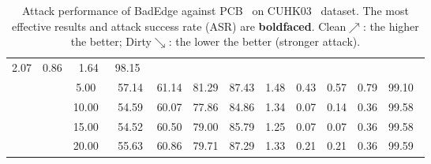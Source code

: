 \begin{table}[htbp]
{\begin{tabular}{cc|c|ccccccccc}
  \multicolumn{1}{c|}{2.07} &
  \multicolumn{1}{c|}{0.86} &
  \multicolumn{1}{c|}{1.64} &
  98.15\ \\ \cline{3-12} 
\multicolumn{1}{c|}{} &
   &
  5.00\ &
  \multicolumn{1}{c|}{57.14} &
  \multicolumn{1}{c|}{61.14} &
  \multicolumn{1}{c|}{81.29} &
  \multicolumn{1}{c|}{87.43} &
  \multicolumn{1}{c|}{1.48} &
  \multicolumn{1}{c|}{0.43} &
  \multicolumn{1}{c|}{0.57} &
  \multicolumn{1}{c|}{0.79} &
  99.10\ \\ \cline{3-12} 
\multicolumn{1}{c|}{} &
   &
  10.00\ &
  \multicolumn{1}{c|}{54.59} &
  \multicolumn{1}{c|}{60.07} &
  \multicolumn{1}{c|}{77.86} &
  \multicolumn{1}{c|}{84.86} &
  \multicolumn{1}{c|}{1.34} &
  \multicolumn{1}{c|}{0.07} &
  \multicolumn{1}{c|}{0.14} &
  \multicolumn{1}{c|}{0.36} &
  99.58\ \\ \cline{3-12} 
\multicolumn{1}{c|}{} &
   &
  15.00\ &
  \multicolumn{1}{c|}{54.52} &
  \multicolumn{1}{c|}{60.50} &
  \multicolumn{1}{c|}{79.00} &
  \multicolumn{1}{c|}{85.79} &
  \multicolumn{1}{c|}{1.25} &
  \multicolumn{1}{c|}{0.07} &
  \multicolumn{1}{c|}{0.07} &
  \multicolumn{1}{c|}{0.36} &
  99.58\ \\ \cline{3-12} 
\multicolumn{1}{c|}{} &
   &
  20.00\ &
  \multicolumn{1}{c|}{55.63} &
  \multicolumn{1}{c|}{60.86} &
  \multicolumn{1}{c|}{79.71} &
  \multicolumn{1}{c|}{87.29} &
  \multicolumn{1}{c|}{1.33} &
  \multicolumn{1}{c|}{0.21} &
  \multicolumn{1}{c|}{0.21} &
  \multicolumn{1}{c|}{0.36} &
  99.59\ \\ \hline
\end{tabular}
}
\caption{
Attack performance of BadEdge against PCB~\cite{sun2018beyond} on CUHK03~\cite{zhang2017alignedreid}  dataset. The most effective results and attack success rate (ASR) are \textbf{boldfaced}. Clean$\nearrow$: the higher the better; Dirty$\searrow$: the lower the better (stronger attack).}
%
\label{tab:PCB_cuhk03}
 \vspace{-0.6cm}
\end{table}